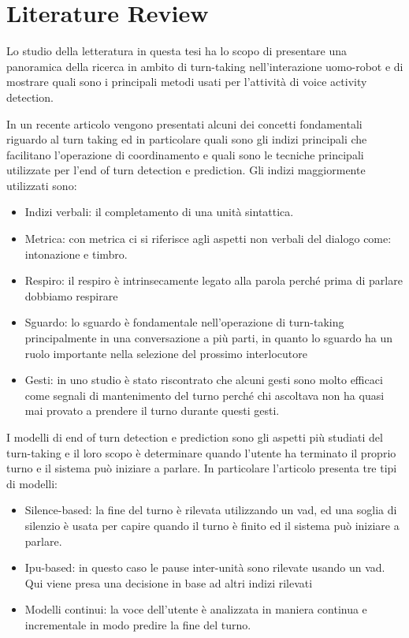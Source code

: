 \documentclass[12pt]{article}
\begin{document}
\section{Literature Review}

Lo studio della letteratura in questa tesi ha lo scopo di presentare una panoramica della ricerca in ambito di turn-taking nell'interazione uomo-robot e di mostrare quali sono i principali metodi usati per l'attività di voice activity detection. 

In un recente articolo vengono presentati alcuni dei concetti fondamentali riguardo al turn taking ed in particolare quali sono gli indizi principali che facilitano l'operazione di coordinamento e quali sono le tecniche principali utilizzate per l'end of turn detection e prediction.
Gli indizi maggiormente utilizzati sono:
\begin{itemize}
    \item Indizi verbali: il completamento di una unità sintattica.
    \item Metrica: con metrica ci si riferisce agli aspetti non verbali del dialogo come: intonazione e timbro. 
    \item Respiro: il respiro è intrinsecamente legato alla parola perché prima di parlare dobbiamo respirare
    \item Sguardo: lo sguardo è fondamentale nell'operazione di turn-taking principalmente in una conversazione a più parti, in quanto lo sguardo ha un ruolo importante nella selezione del prossimo interlocutore
    \item Gesti: in uno studio è stato riscontrato che alcuni gesti sono molto efficaci come segnali di mantenimento del turno perché chi ascoltava non ha quasi mai provato a prendere il turno durante questi gesti.
\end{itemize}

I modelli di end of turn detection e prediction sono gli aspetti più studiati del turn-taking e il loro scopo è determinare quando l'utente ha terminato il proprio turno e il sistema può iniziare a parlare. In particolare l'articolo presenta tre tipi di modelli:
\begin{itemize}
    \item Silence-based: la fine del turno è rilevata utilizzando un vad, ed una soglia di silenzio è usata per capire quando il turno è finito ed il sistema può iniziare a parlare.
    \item Ipu-based: in questo caso le pause inter-unità sono rilevate usando un vad. Qui viene presa una decisione in base ad altri indizi rilevati
    \item Modelli continui: la voce dell'utente è analizzata in maniera continua e incrementale in modo predire la fine del turno.
\end{itemize}
\end{document}
